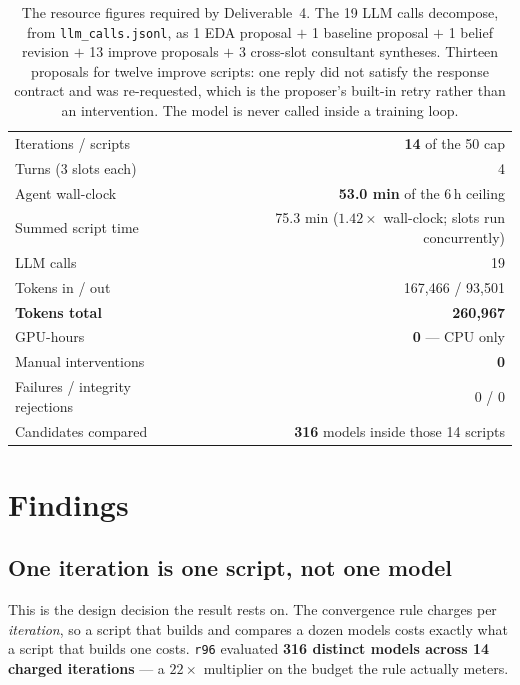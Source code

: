 \documentclass[11pt,a4paper]{article}
\newcommand{\file}[1]{\texttt{#1}}
\begin{document}
\begin{table}[htbp]
\centering
\small
\begin{tabular}{@{}lr@{}}
\toprule
Iterations / scripts        & \textbf{14} of the 50 cap \\
Turns (3 slots each)        & 4 \\
Agent wall-clock            & \textbf{53.0 min} of the 6\,h ceiling \\
Summed script time          & 75.3 min ($1.42\times$ wall-clock; slots run concurrently) \\
LLM calls                   & 19 \\
Tokens in / out             & 167{,}466 / 93{,}501 \\
\textbf{Tokens total}       & \textbf{260{,}967} \\
GPU-hours                   & \textbf{0} --- CPU only \\
Manual interventions        & \textbf{0} \\
Failures / integrity rejections & 0 / 0 \\
Candidates compared         & \textbf{316} models inside those 14 scripts \\
\bottomrule
\end{tabular}
\caption{The resource figures required by Deliverable~4. The 19 LLM calls decompose, from
\file{llm\_calls.jsonl}, as 1 EDA proposal $+$ 1 baseline proposal $+$ 1 belief revision $+$
13 improve proposals $+$ 3 cross-slot consultant syntheses. Thirteen proposals for twelve
improve scripts: one reply did not satisfy the response contract and was re-requested, which is
the proposer's built-in retry rather than an intervention. The model is never called inside a
training loop.}
\label{tab:resources}
\end{table}

\section{Findings}
\label{sec:findings}

\subsection{One iteration is one script, not one model}

This is the design decision the result rests on. The convergence rule charges per
\emph{iteration}, so a script that builds and compares a dozen models costs exactly what a
script that builds one costs. \texttt{r96} evaluated \textbf{316 distinct models across 14
charged iterations} --- a $22\times$ multiplier on the budget the rule actually meters.
\end{document}
